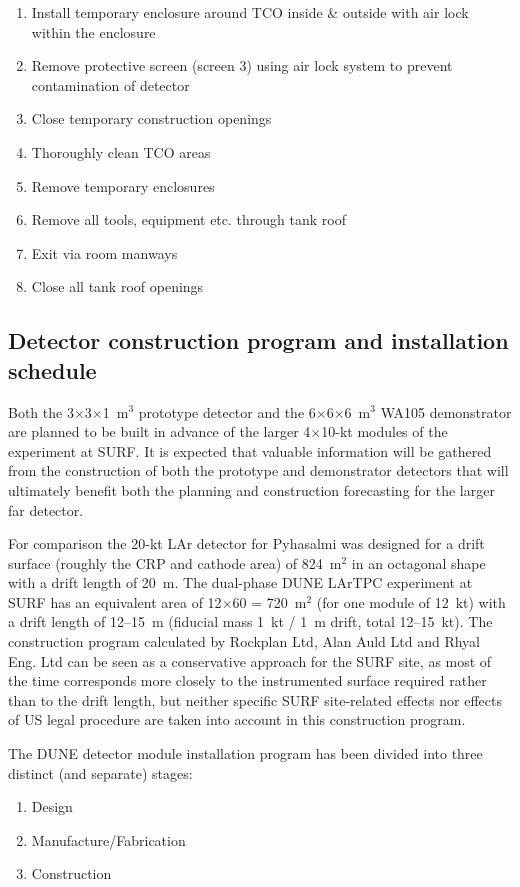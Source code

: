 \begin{enumerate}
\item{Install temporary enclosure around TCO inside \& outside with air lock within the enclosure}
\item{ Remove protective screen (screen 3) using air lock system to prevent contamination of detector}
\item{Close temporary construction openings}
\item{Thoroughly clean TCO areas}
\item{Remove temporary enclosures}
\item{Remove all tools, equipment etc. through tank roof}
\item{Exit via room manways}
\item{Close all tank roof openings}
\end{enumerate}

\subsection{Detector construction program and installation schedule}

Both the 3$\times$3$\times$1~m$^3$ prototype detector and the
6$\times$6$\times$6~m$^3$ WA105 demonstrator are planned to be built in
advance of the larger 4$\times$10-kt modules of the experiment at
SURF. It is expected that valuable information will be gathered
from the construction of both the prototype and demonstrator detectors
that will ultimately benefit both the planning and construction
forecasting for the larger far detector. %

For comparison the 20-kt LAr detector for Pyhasalmi was designed for a
drift surface (roughly the CRP and cathode area) of 824~m$^2$ in an
octagonal shape with a drift length of 20~m. The dual-phase DUNE
LArTPC experiment at SURF has an equivalent area of 12$\times$60 =
720~m$^2$ (for one module of 12~kt) with a drift length of 12--15~m
(fiducial mass 1~kt / 1~m drift, total 12--15~kt). The construction
program calculated by Rockplan Ltd, Alan Auld Ltd and Rhyal Eng. Ltd
can be seen as a conservative approach for the SURF site, as most
of the time corresponds more closely to %
the instrumented surface required  rather than to %
the drift length, but neither specific SURF site-related
effects nor effects of US legal procedure are  taken into account
in this construction program.

The DUNE detector module installation program has been divided into three distinct (and separate)
stages:
\begin{enumerate}
\item{Design}
\item{Manufacture/Fabrication} 
\item{Construction }
\end{enumerate}  

